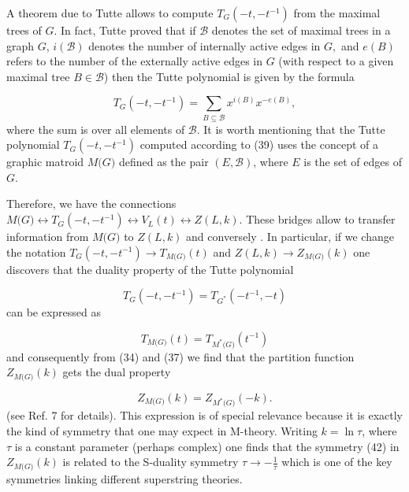 \documentclass[a4paper,12pt]{article}
\begin{document}
A theorem due to Tutte allows to compute $T_{\mathit{G}}(-t,-t^{-1})$ from
the maximal trees of $\mathit{G}$. In fact, Tutte proved that if $\mathcal{B}
$ denotes the set of maximal trees in a graph $\mathit{G}$, $i(\mathcal{B})$
denotes the number of internally active edges in $\mathit{G,}$ and $e(B)$
refers to the number of the externally active edges in $\mathit{G}$ (with
respect to a given maximal tree $B\in \mathcal{B}$) then the Tutte
polynomial is given by the formula

\begin{equation}
T_{\mathit{G}}(-t,-t^{-1})=\sum_{B\subseteq \mathcal{B}}x^{i(B)}x^{-e(B)},
\label{39}
\end{equation}
where the sum is over all elements of $\mathcal{B}$. It is worth mentioning
that the Tutte polynomial $T_{\mathit{G}}(-t,-t^{-1})$ computed according to
(39) uses the concept of a graphic matroid $M(\mathit{G)}$ defined as the
pair $(E,\mathcal{B})$, where $E$ is the set of edges of $\mathit{G}$.

Therefore, we have the connections $M(\mathit{G)\leftrightarrow }T_{\mathit{G%
}}(-t,-t^{-1})\leftrightarrow V_{L}(t)\leftrightarrow Z(L,k)$. These bridges
allow to transfer information from $M(\mathit{G)}$ to $Z(L,k)$ and conversely%
$.$ In particular, if we change the notation $T_{\mathit{G}%
}(-t,-t^{-1})\rightarrow T_{M(\mathit{G)}}(t)$ and $Z(L,k)\rightarrow Z_{M(%
\mathit{G)}}(k)$ one discovers that the duality property of the Tutte
polynomial

\begin{equation}
T_{\mathit{G}}(-t,-t^{-1})=T_{\mathit{G}^{\ast }}(-t^{-1},-t)  \label{40}
\end{equation}
can be expressed as

\begin{equation}
T_{M(\mathit{G)}}(t)=T_{M^{\ast }(\mathit{G)}}(t^{-1})  \label{41}
\end{equation}
and consequently from (34) and (37) we find that the partition function $%
Z_{M(\mathit{G)}}(k)$ gets the dual property

\begin{equation}
Z_{M(\mathit{G)}}(k)=Z_{M^{\ast }(\mathit{G)}}(-k).  \label{42}
\end{equation}
(see Ref. 7 for details). This expression is of special relevance because it
is exactly the kind of symmetry that one may expect in M-theory. Writing $%
k=\ln \tau $, where $\tau $ is a constant parameter (perhaps complex) one
finds that the symmetry (42) in $Z_{M(\mathit{G)}}(k)$ is related to the
S-duality symmetry $\tau \rightarrow -\frac{1}{\tau }$ which is one of the
key symmetries linking different superstring theories.
\end{document}
